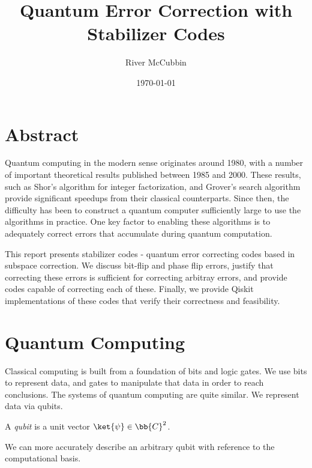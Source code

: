 \documentclass{article}
\title{Quantum Error Correction with Stabilizer Codes}
\author{River McCubbin}
\date{\today}
\begin{document}
\maketitle

\section{Abstract}

Quantum computing in the modern sense originates around 1980, with a number of important theoretical results published between 1985 and 2000.
These results, such as Shor's algorithm for integer factorization, and Grover's search algorithm provide significant speedups from their classical counterparts.
Since then, the difficulty has been to construct a quantum computer sufficiently large to use the algorithms in practice.
One key factor to enabling these algorithms is to adequately correct errors that accumulate during quantum computation.

This report presents stabilizer codes - quantum error correcting codes based in subspace correction.
We discuss bit-flip and phase flip errors, justify that correcting these errors is sufficient for correcting arbitray errors, and provide codes capable of correcting each of these.
Finally, we provide Qiskit implementations of these codes that verify their correctness and feasibility.

\section{Quantum Computing}

        Classical computing is built from a foundation of bits and logic gates.
        We use bits to represent data, and gates to manipulate that data in order to reach conclusions.
        The systems of quantum computing are quite similar.
        We represent data via qubits.
        \begin{definition}
                A \textit{qubit} is a unit vector $\ket{\psi} \in \bb{C}^2$.
        \end{definition}

        We can more accurately describe an arbitrary qubit with reference to the computational basis.
        
\end{document}
